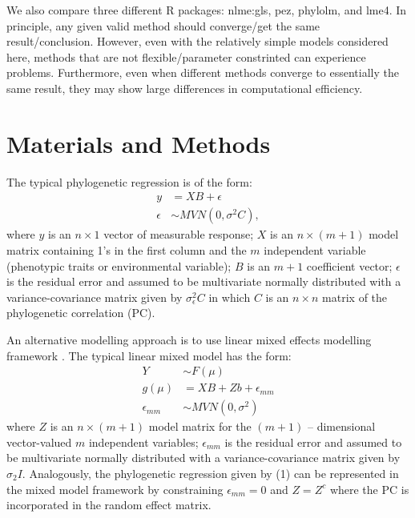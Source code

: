 We also compare three different R packages: nlme:gls, pez, phylolm, and lme4.
In principle, any given valid method should converge/get the same result/conclusion.
However, even with the relatively simple models considered here, methods that are not flexible/parameter constrinted can experience problems.
Furthermore, even when different methods converge to essentially the same result, they may show large differences in computational efficiency.

\section{Materials and Methods}

The typical phylogenetic regression is of the form:
\begin{align}
y & = XB + \epsilon \\
\epsilon & \sim MVN(0,\sigma^{2}C),
\label{eq:gls}
\end{align}
where $y$ is an $n \times 1$ vector of measurable response; $X$ is an $n \times (m + 1)$ model matrix containing 1's in the first column and the $m$ independent variable (phenotypic traits or environmental variable); $B$ is an $m + 1$ coefficient vector; $\epsilon$ is the residual error and assumed to be multivariate normally distributed with a variance-covariance matrix given by $\sigma^{2}_{\epsilon}C$ in which $C$ is an $n \times n$ matrix of the phylogenetic correlation (PC).

An alternative modelling approach is to use linear mixed effects modelling framework \citep{lynch1991methods}.
The typical linear mixed model has the form:
\begin{align}
Y & \sim F(\mu) \\
g(\mu) & = XB + Zb + \epsilon_{mm} \\
\epsilon_{mm} & \sim MVN(0,\sigma^2)
\end{align}
where $Z$ is an $n \times (m+1)$ model matrix for the $(m+1)$ -- dimensional vector-valued $m$ independent variables; $\epsilon_{mm}$ is the residual error and assumed to be multivariate normally distributed with a variance-covariance matrix given by $\sigma_{2}I$.
Analogously, the phylogenetic regression given by (1) can be represented in the mixed model framework by constraining $\epsilon_{mm} = 0$ and $Z=Z^{c}$ where the PC is incorporated in the random effect matrix. 

